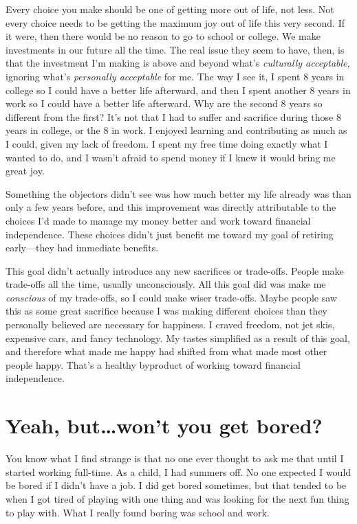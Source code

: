 Every choice you make should be one of getting more out of life, not less. Not every choice needs to be getting the maximum joy out of life this very second. If it were, then there would be no reason to go to school or college. We make investments in our future all the time. The real issue they seem to have, then, is that the investment I'm making is above and beyond what's \emph{culturally acceptable,} ignoring what's \emph{personally acceptable} for me. The way I see it, I spent 8 years in college so I could have a better life afterward, and then I spent another 8 years in work so I could have a better life afterward. Why are the second 8 years so different from the first? It's not that I had to suffer and sacrifice during those 8 years in college, or the 8 in work. I enjoyed learning and contributing as much as I could, given my lack of freedom. I spent my free time doing exactly what I wanted to do, and I wasn't afraid to spend money if I knew it would bring me great joy.

Something the objectors didn't see was how much better my life already was than only a few years before, and this improvement was directly attributable to the choices I'd made to manage my money better and work toward financial independence. These choices didn't just benefit me toward my goal of retiring early---they had immediate benefits.

This goal didn't actually introduce any new sacrifices or trade-offs. People make trade-offs all the time, usually unconsciously. All this goal did was make me \emph{conscious} of my trade-offs, so I could make wiser trade-offs. Maybe people saw this as some great sacrifice because I was making different choices than they personally believed are necessary for happiness. I craved freedom, not jet skis, expensive cars, and fancy technology. My tastes simplified as a result of this goal, and therefore what made me happy had shifted from what made most other people happy. That's a healthy byproduct of working toward financial independence.

\section{Yeah, but\ldots won't you get bored?}
You know what I find strange is that no one ever thought to ask me that until I started working full-time. As a child, I had summers off. No one expected I would be bored if I didn't have a job. I did get bored sometimes, but that tended to be when I got tired of playing with one thing and was looking for the next fun thing to play with. What I really found boring was school and work.

